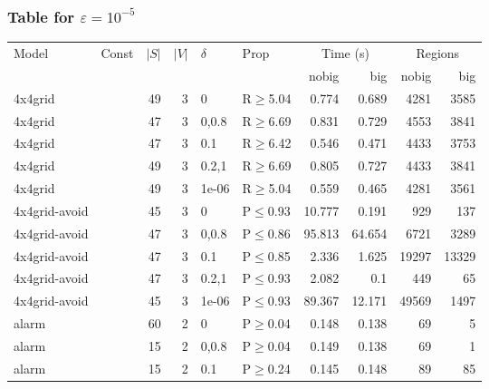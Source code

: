 \subsubsection{Table for \(\varepsilon=10^{-5}\)}
\begin{longtable}{llrrllrrrr}

        \toprule
        Model & Const & $|S|$ & $|V|$ & $\delta$ & Prop & \multicolumn{2}{c}{Time (s)} & \multicolumn{2}{c}{Regions} \\
        \cmidrule(ll){7-8} \cmidrule(ll){9-10}
        & & & & & & nobig & big & nobig & big \\
        \midrule
        
 4x4grid       &          &     	49 &   3 & 0     & R$\geq$5.04  & 0.774    & 0.689    & 4281    & 3585   \\
 4x4grid       &          &     	47 &   3 & 0,0.8 & R$\geq$6.69  & 0.831    & 0.729    & 4553    & 3841   \\
 4x4grid       &          &     	47 &   3 & 0.1   & R$\geq$6.42  & 0.546    & 0.471    & 4433    & 3753   \\
 4x4grid       &          &     	49 &   3 & 0.2,1 & R$\geq$6.69  & 0.805    & 0.727    & 4433    & 3841   \\
 4x4grid       &          &     	49 &   3 & 1e-06 & R$\geq$5.04  & 0.559    & 0.465    & 4281    & 3561   \\
 4x4grid-avoid &          &     	45 &   3 & 0     & P$\leq$0.93  & 10.777   & 0.191    & 929     & 137    \\
 4x4grid-avoid &          &     	47 &   3 & 0,0.8 & P$\leq$0.86  & 95.813   & 64.654   & 6721    & 3289   \\
 4x4grid-avoid &          &     	47 &   3 & 0.1   & P$\leq$0.85  & 2.336    & 1.625    & 19297   & 13329  \\
 4x4grid-avoid &          &     	47 &   3 & 0.2,1 & P$\leq$0.93  & 2.082    & 0.1      & 449     & 65     \\
 4x4grid-avoid &          &     	45 &   3 & 1e-06 & P$\leq$0.93  & 89.367   & 12.171   & 49569   & 1497   \\
 alarm         &          &     	60 &   2 & 0     & P$\geq$0.04  & 0.148    & 0.138    & 69      & 5      \\
 alarm         &          &     	15 &   2 & 0,0.8 & P$\geq$0.04  & 0.149    & 0.138    & 69      & 1      \\
 alarm         &          &     	15 &   2 & 0.1   & P$\geq$0.24  & 0.145    & 0.148    & 89      & 85     \\

\end{longtable}

